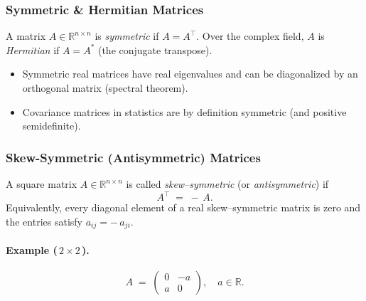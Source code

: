 \subsubsection{Symmetric \& Hermitian Matrices}
A matrix $A \in \mathbb{R}^{n \times n}$ is \emph{symmetric} if $A = A^\top$. 
Over the complex field, $A$ is \emph{Hermitian} if $A = A^*$ (the conjugate transpose).
\begin{itemize}
    \item Symmetric real matrices have real eigenvalues and can be diagonalized by an orthogonal matrix (spectral theorem).
    \item Covariance matrices in statistics are by definition symmetric (and positive semidefinite).
\end{itemize}

\subsubsection{Skew-Symmetric (Antisymmetric) Matrices}
A square matrix $A \in \mathbb{R}^{n \times n}$ is called \emph{skew--symmetric} (or \emph{antisymmetric}) if
\[
A^\top \;=\; -\,A.
\]
Equivalently, every diagonal element of a real skew--symmetric matrix is zero and the entries satisfy $a_{ij} = -\,a_{ji}$.

\paragraph{Example (\,{$2 \times 2$}\,).}
\[
A \;=\;\begin{pmatrix} 0 & -a \\[2pt] a & 0 \end{pmatrix}, 
\quad a \in \mathbb{R}.
\]

